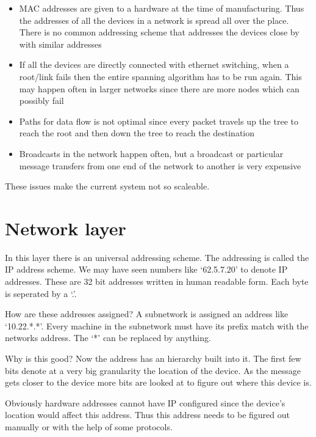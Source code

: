 \documentclass[12pt]{article}
\begin{document}
\begin{itemize}
\item MAC addresses are given to a hardware at the time of manufacturing. Thus the addresses of all the devices in a network 
is spread all over the place. There is no common addressing scheme that addresses the devices close by with similar addresses 
 \item If all the devices are directly connected with ethernet switching, when a 
 root/link fails then the entire spanning algorithm has to be run again. This may happen often in larger 
 networks since there are more nodes which can possibly fail
 \item Paths for data flow is not optimal since every packet travels up the tree to reach the root and then 
 down the tree to reach the destination
 \item Broadcasts in the network happen often, but a broadcast or particular message transfers from one  
 end of the network to another is very expensive
\end{itemize}

These issues make the current system not so scaleable. 

\part{Network layer}

In this layer there is an universal addressing scheme. The addressing is called the IP address scheme. 
We may have seen numbers like `62.5.7.20' to denote IP addresses. These are 32 bit 
addresses written in human readable form. Each byte is seperated by a `.'.

How are these addresses assigned? A subnetwork is assigned an address like `10.22.*.*'. 
Every machine in the subnetwork must have its prefix match with the networks address. The `*' can be replaced by anything. 

Why is this good? Now the address has an hierarchy built into it. The first few bits denote at a very big granularity 
the location of the device. As the message gets closer to the device more bits are looked at 
to figure out where this device is.

Obviously hardware addresses cannot have IP configured since the device's location would affect this address. Thus this address needs to be 
figured out manually or with the help of some protocols.    
\end{document}
